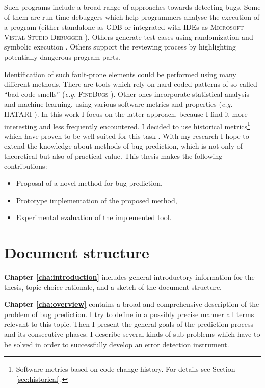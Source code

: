 \documentclass{pracamgr}
\newcommand{\bpar}[1]{\medskip\noindent\textbf{#1}}
\begin{document}
Such programs include a broad range of approaches towards detecting bugs. Some of them are run-time debuggers which help programmers analyse the execution of a program (either standalone as GDB \cite{gdb} or integrated with IDEs as \textsc{Microsoft Visual Studio Debugger} \cite{vs_debugger}). Others generate test cases using randomization and symbolic execution \cite{symbolic, puzzle}. Others support the reviewing process by highlighting potentially dangerous program parts.

Identification of such fault-prone elements could be performed using many different methods. There are tools which rely on hard-coded patterns of so-called ``bad code smells'' (\textit{e.g.} \textsc{FindBugs} \cite{findbugs}). Other ones incorporate statistical analysis and machine learning, using various software metrics and properties (\textit{e.g.} HATARI \cite{hatari}). In this work I focus on the latter approach, because I find it more interesting and less frequently encountered. I decided to use historical metrics\footnote{Software metrics based on code change history. For details see Section \ref{sec:historical}.} which have proven to be well-suited for this task \cite{merits, comparative, how_and_why}. With my research I hope to extend the knowledge about methods of bug prediction, which is not only of theoretical but also of practical value. This thesis makes the following contributions:
\begin{itemize}
	\item Proposal of a novel method for bug prediction,
	\item Prototype implementation of the proposed method,
	\item Experimental evaluation of the implemented tool.
\end{itemize}

\section{Document structure}
\label{sec:structure}

\textbf{Chapter \ref{cha:introduction}} includes general introductory information for the thesis, topic choice rationale, and a sketch of the document structure. 

\bpar{Chapter \ref{cha:overview}} contains a broad and comprehensive description of the problem of bug prediction. I try to define in a possibly precise manner all terms relevant to this topic. Then I present the general goals of the prediction process and its consecutive phases. I describe several kinds of sub-problems which have to be solved in order to successfully develop an error detection instrument.
\end{document}
